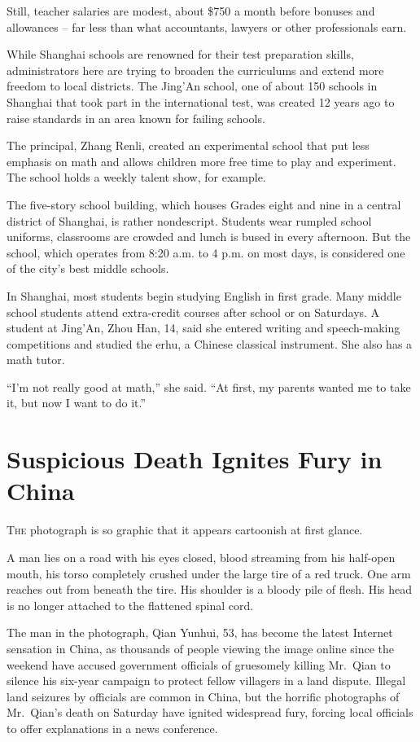 ﻿\documentclass[12pt]{article}
\begin{document}
Still, teacher salaries are modest, about \$750 a month before bonuses and allowances -- far less
than what accountants, lawyers or other professionals earn.

While Shanghai schools are renowned for their test preparation skills, administrators here are
trying to broaden the curriculums and extend more freedom to local districts. The Jing'An school,
one of about 150 schools in Shanghai that took part in the international test, was created 12 years
ago to raise standards in an area known for failing schools.

The principal, Zhang Renli, created an experimental school that put less emphasis on math and allows
children more free time to play and experiment. The school holds a weekly talent show, for example.

The five-story school building, which houses Grades eight and nine in a central district of
Shanghai, is rather nondescript. Students wear rumpled school uniforms, classrooms are crowded and
lunch is bused in every afternoon. But the school, which operates from 8:20 a.m. to 4 p.m. on most
days, is considered one of the city's best middle schools.

In Shanghai, most students begin studying English in first grade. Many middle school students attend
extra-credit courses after school or on Saturdays. A student at Jing'An, Zhou Han, 14, said she
entered writing and speech-making competitions and studied the erhu, a Chinese classical instrument.
She also has a math tutor.

``I'm not really good at math,'' she said. ``At first, my parents wanted me to take it, but now I
want to do it.''

\section{Suspicious Death Ignites Fury in China}

\lettrine{T}{he} photograph is so graphic that it appears cartoonish at
first glance.

A man lies on a road with his eyes closed, blood streaming from his half-open mouth, his torso
completely crushed under the large tire of a red truck. One arm reaches out from beneath the tire.
His shoulder is a bloody pile of flesh. His head is no longer attached to the flattened spinal cord.

The man in the photograph, Qian Yunhui, 53, has become the latest Internet sensation in China, as
thousands of people viewing the image online since the weekend have accused government officials of
gruesomely killing Mr.~Qian to silence his six-year campaign to protect fellow villagers in a land
dispute. Illegal land seizures by officials are common in China, but the horrific photographs of
Mr.~Qian's death on Saturday have ignited widespread fury, forcing local officials to offer
explanations in a news conference.
\end{document}
